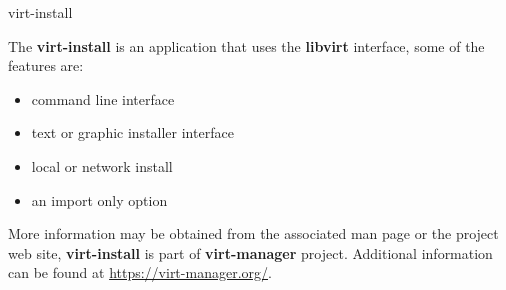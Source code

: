 \cprotect{}

\begin{frame}
   {virt-install}

	The \textbf{virt-install} is an application that uses the 
	\textbf{libvirt} interface, some of the features are: 
	\begin{itemize}
		\item command line interface 
		\item text or graphic installer interface
		\item local or network install 
		\item an import only option 
	\end{itemize}

	More information may be obtained from the associated man page or the 
	project web site, \textbf{virt-install} is part of \textbf{virt-manager} project. 
	Additional information can be found at \url{https://virt-manager.org/}.


\end{frame}

